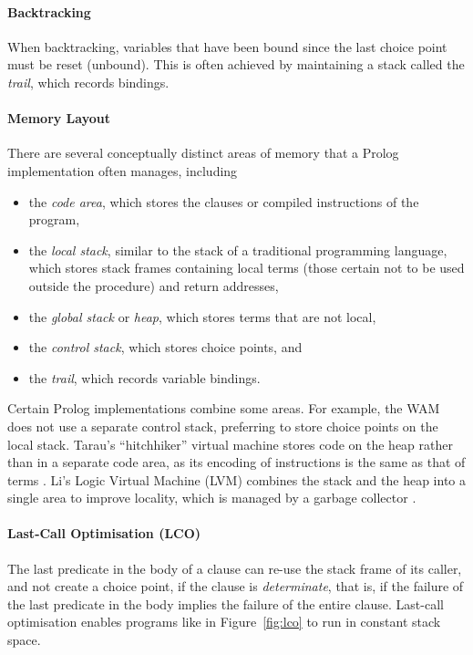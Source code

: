 \paragraph{Backtracking} When backtracking, variables that have been bound since the last choice point must be reset (unbound). This is often achieved by maintaining a stack called the \emph{trail}, which records bindings.

\paragraph{Memory Layout} There are several conceptually distinct areas of memory that a Prolog implementation often manages, including

\begin{itemize}
\item the \emph{code area}, which stores the clauses or compiled instructions of the program,
\item the \emph{local stack}, similar to the stack of a traditional programming language, which stores stack frames containing local terms (those certain not to be used outside the procedure) and return addresses,
\item the \emph{global stack} or \emph{heap}, which stores terms that are not local,
\item the \emph{control stack}, which stores choice points, and
\item the \emph{trail}, which records variable bindings.
\end{itemize}

Certain Prolog implementations combine some areas. For example, the WAM does not use a separate control stack, preferring to store choice points on the local stack. Tarau's ``hitchhiker'' virtual machine stores code on the heap rather than in a separate code area, as its encoding of instructions is the same as that of terms \cite{tarauHitchhikersGuideReinventing2018}. Li's Logic Virtual Machine (LVM) combines the stack and the heap into a single area to improve locality, which is managed by a garbage collector \cite{liEfficientMemoryManagement2000}.

\paragraph{Last-Call Optimisation (LCO)} The last predicate in the body of a clause can re-use the stack frame of its caller, and not create a choice point, if the clause is \emph{determinate}, that is, if the failure of the last predicate in the body implies the failure of the entire clause. Last-call optimisation enables programs like in Figure~\ref{fig:lco} to run in constant stack space.

